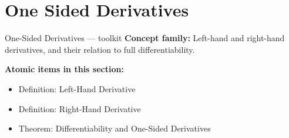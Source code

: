 \section{One Sided Derivatives}

\begin{toolkitbox}{One-Sided Derivatives --- toolkit}
\textbf{Concept family:} Left-hand and right-hand derivatives, and their relation to full differentiability.

\medskip
\textbf{Atomic items in this section:}
\begin{itemize}
  \item Definition: Left-Hand Derivative
  \item Definition: Right-Hand Derivative
  \item Theorem: Differentiability and One-Sided Derivatives
\end{itemize}
\end{toolkitbox}



